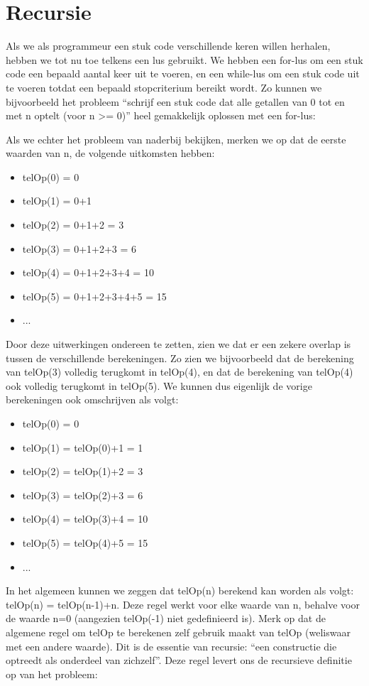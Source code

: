 \chapter{Recursie}
Als we als programmeur een stuk code verschillende keren willen herhalen, hebben we tot nu toe telkens een lus gebruikt. We hebben een for-lus om een stuk code een bepaald aantal keer uit te voeren, en een while-lus om een stuk code uit te voeren totdat een bepaald stopcriterium bereikt wordt. Zo kunnen we bijvoorbeeld het probleem ``schrijf een stuk code dat alle getallen van 0 tot en met n optelt (voor n >= 0)'' heel gemakkelijk oplossen met een for-lus:


Als we echter het probleem van naderbij bekijken, merken we op dat de eerste waarden van n, de volgende uitkomsten hebben:

\begin{itemize}
\item[] telOp(0) = 0
\item[] telOp(1) = 0+1
\item[] telOp(2) = 0+1+2 = 3
\item[] telOp(3) = 0+1+2+3 = 6
\item[] telOp(4) = 0+1+2+3+4 = 10
\item[] telOp(5) = 0+1+2+3+4+5 = 15
\item[] ...
\end{itemize}

Door deze uitwerkingen ondereen te zetten, zien we dat er een zekere overlap is tussen de verschillende berekeningen. Zo zien we bijvoorbeeld dat de berekening van telOp(3) volledig terugkomt in telOp(4), en dat de berekening van telOp(4) ook volledig terugkomt in telOp(5). We kunnen dus eigenlijk de vorige berekeningen ook omschrijven als volgt:

\begin{itemize}
\item[] telOp(0) = 0
\item[] telOp(1) = telOp(0)+1 = 1
\item[] telOp(2) = telOp(1)+2 = 3
\item[] telOp(3) = telOp(2)+3 = 6
\item[] telOp(4) = telOp(3)+4 = 10
\item[] telOp(5) = telOp(4)+5 = 15
\item[] ...
\end{itemize}

In het algemeen kunnen we zeggen dat telOp(n) berekend kan worden als volgt: telOp(n) = telOp(n-1)+n. Deze regel werkt voor elke waarde van n, behalve voor de waarde n=0 (aangezien telOp(-1) niet gedefinieerd is). Merk op dat de algemene regel om telOp te berekenen zelf gebruik maakt van telOp (weliswaar met een andere waarde). Dit is de essentie van recursie: ``een constructie die optreedt als onderdeel van zichzelf''. Deze regel levert ons de recursieve definitie op van het probleem:


